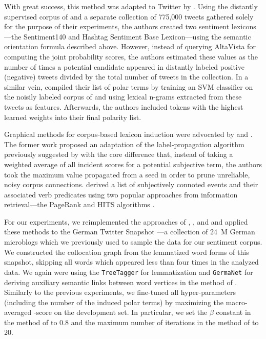With great success, this method was adapted to Twitter by
\citet{Kiritchenko:14}.  Using the distantly supervised corpus of
\citet{Go:09} and a separate collection of 775,000 tweets gathered
solely for the purpose of their experiments, the authors created two
sentiment lexicons---the Sentiment140 and Hashtag Sentiment Base
Lexicon---using the semantic orientation formula described above.
However, instead of querying AltaVista for computing the joint
probability scores, the authors estimated these values as the number
of times a potential candidate appeared in distantly labeled positive
(negative) tweets divided by the total number of tweets in the
collection.  In a similar vein, \citet{Severyn:15a} compiled their
list of polar terms by training an SVM classifier on the noisily
labeled corpus of \citet{Go:09} and using lexical n-grams extracted
from these tweets as features.  Afterwards, the authors included
tokens with the highest learned weights into their final polarity
list.

Graphical methods for corpus-based lexicon induction were advocated by
\citet{Velikovich:10} and \citet{Feng:11}.  The former work proposed
an adaptation of the label-propagation algorithm previously suggested
by \citet{Rao:09} with the core difference that, instead of taking a
weighted average of all incident scores for a potential subjective
term, the authors took the maximum value propagated from a seed in
order to prune unreliable, noisy corpus connections.  \citet{Feng:11}
derived a list of subjectively connoted events and their associated
verb predicates using two popular approaches from information
retrieval---the PageRank \cite{Brin:98} and HITS algorithms
\cite{Kleinberg:99}.

For our experiments, we reimplemented the approaches of
\citet{Takamura:05}, \citet{Velikovich:10}, \citet{Kiritchenko:14} and
\citet{Severyn:15} and applied these methods to the German Twitter
Snapshot \cite{Scheffler:14}---a collection of 24~M German microblogs
which we previously used to sample the data for our sentiment corpus.
We constructed the collocation graph from the lemmatized word forms of
this snapshot, skipping all words which appeared less than four times
in the analyzed data.  We again were using the \texttt{TreeTagger}
\cite{Schmid:95} for lemmatization and \texttt{GermaNet} for deriving
auxiliary semantic links between word vertices in the method of
\citet{Takamura:05}.  Similarly to the previous experiments, we
fine-tuned all hyper-parameters (including the number of the induced
polar terms) by maximizing the macro-averaged \F{}-score on the
development set.  In particular, we set the $\beta$ constant in the
method of \citet{Takamura:05} to 0.8 and the maximum number of
iterations in the method of \citet{Velikovich:10} to 20.

